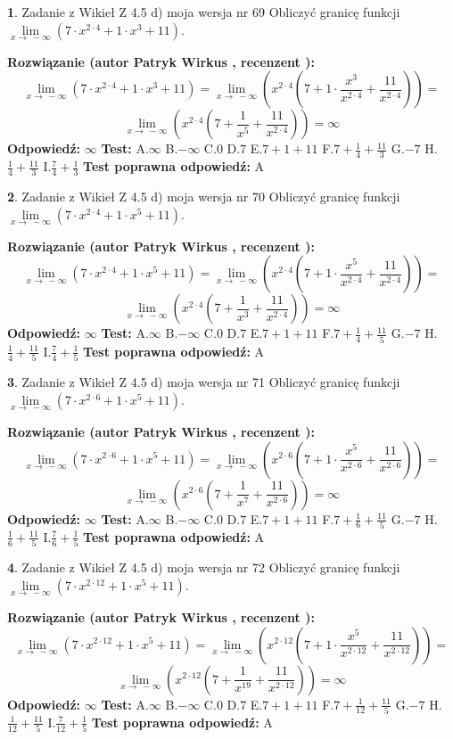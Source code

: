 \documentclass[12pt, a4paper]{article}
\theoremstyle{definition} %
\newtheorem{zad}{}
\newcommand{\zadStart}[1]{\begin{zad}#1\newline}
\newcommand{\zadStop}{\end{zad}}
\newcommand{\rozwStart}[2]{\noindent \textbf{Rozwiązanie (autor #1 , recenzent #2): }\newline}
\newcommand{\rozwStop}{\newline}
\newcommand{\odpStart}{\noindent \textbf{Odpowiedź:}\newline}
\newcommand{\odpStop}{\newline}
\newcommand{\testStart}{\noindent \textbf{Test:}\newline}
\newcommand{\testStop}{\newline}
\newcommand{\kluczStart}{\noindent \textbf{Test poprawna odpowiedź:}\newline}
\newcommand{\kluczStop}{\newline}
\begin{document}
\zadStart{Zadanie z Wikieł Z 4.5 d) moja wersja nr 69}
Obliczyć granicę funkcji  $\lim\limits_{x\to\ -\infty}(7 \cdot x^{2\cdot4}+1 \cdot x^{3}+11)$.
\zadStop
\rozwStart{Patryk Wirkus}{}
$$\lim\limits_{x\to\ -\infty}(7 \cdot x^{2\cdot4}+1 \cdot x^{3}+11) = \lim\limits_{x\to\ -\infty}(x^{2\cdot4}(7 +1 \cdot \frac{x^{3}}{x^{2\cdot4}}+\frac{11}{x^{2\cdot4}})) =$$ $$\lim\limits_{x\to\ -\infty}(x^{2\cdot4}(7 +\frac{1}{x^{5}}+\frac{11}{x^{2\cdot4}})) =\infty$$
\rozwStop
\odpStart
$\infty$
\odpStop
\testStart
A.$\infty$ B.$-\infty$ C.$0$ D.$7$ E.$7 + 1 + 11$
F.$7+\frac{1}{4}+\frac{11}{3}$ G.$-7$
H.$\frac{1}{4}+\frac{11}{3}$
I.$\frac{7}{4}+\frac{1}{3}$
\testStop
\kluczStart
A
\kluczStop



\zadStart{Zadanie z Wikieł Z 4.5 d) moja wersja nr 70}
Obliczyć granicę funkcji  $\lim\limits_{x\to\ -\infty}(7 \cdot x^{2\cdot4}+1 \cdot x^{5}+11)$.
\zadStop
\rozwStart{Patryk Wirkus}{}
$$\lim\limits_{x\to\ -\infty}(7 \cdot x^{2\cdot4}+1 \cdot x^{5}+11) = \lim\limits_{x\to\ -\infty}(x^{2\cdot4}(7 +1 \cdot \frac{x^{5}}{x^{2\cdot4}}+\frac{11}{x^{2\cdot4}})) =$$ $$\lim\limits_{x\to\ -\infty}(x^{2\cdot4}(7 +\frac{1}{x^{3}}+\frac{11}{x^{2\cdot4}})) =\infty$$
\rozwStop
\odpStart
$\infty$
\odpStop
\testStart
A.$\infty$ B.$-\infty$ C.$0$ D.$7$ E.$7 + 1 + 11$
F.$7+\frac{1}{4}+\frac{11}{5}$ G.$-7$
H.$\frac{1}{4}+\frac{11}{5}$
I.$\frac{7}{4}+\frac{1}{5}$
\testStop
\kluczStart
A
\kluczStop



\zadStart{Zadanie z Wikieł Z 4.5 d) moja wersja nr 71}
Obliczyć granicę funkcji  $\lim\limits_{x\to\ -\infty}(7 \cdot x^{2\cdot6}+1 \cdot x^{5}+11)$.
\zadStop
\rozwStart{Patryk Wirkus}{}
$$\lim\limits_{x\to\ -\infty}(7 \cdot x^{2\cdot6}+1 \cdot x^{5}+11) = \lim\limits_{x\to\ -\infty}(x^{2\cdot6}(7 +1 \cdot \frac{x^{5}}{x^{2\cdot6}}+\frac{11}{x^{2\cdot6}})) =$$ $$\lim\limits_{x\to\ -\infty}(x^{2\cdot6}(7 +\frac{1}{x^{7}}+\frac{11}{x^{2\cdot6}})) =\infty$$
\rozwStop
\odpStart
$\infty$
\odpStop
\testStart
A.$\infty$ B.$-\infty$ C.$0$ D.$7$ E.$7 + 1 + 11$
F.$7+\frac{1}{6}+\frac{11}{5}$ G.$-7$
H.$\frac{1}{6}+\frac{11}{5}$
I.$\frac{7}{6}+\frac{1}{5}$
\testStop
\kluczStart
A
\kluczStop



\zadStart{Zadanie z Wikieł Z 4.5 d) moja wersja nr 72}
Obliczyć granicę funkcji  $\lim\limits_{x\to\ -\infty}(7 \cdot x^{2\cdot12}+1 \cdot x^{5}+11)$.
\zadStop
\rozwStart{Patryk Wirkus}{}
$$\lim\limits_{x\to\ -\infty}(7 \cdot x^{2\cdot12}+1 \cdot x^{5}+11) = \lim\limits_{x\to\ -\infty}(x^{2\cdot12}(7 +1 \cdot \frac{x^{5}}{x^{2\cdot12}}+\frac{11}{x^{2\cdot12}})) =$$ $$\lim\limits_{x\to\ -\infty}(x^{2\cdot12}(7 +\frac{1}{x^{19}}+\frac{11}{x^{2\cdot12}})) =\infty$$
\rozwStop
\odpStart
$\infty$
\odpStop
\testStart
A.$\infty$ B.$-\infty$ C.$0$ D.$7$ E.$7 + 1 + 11$
F.$7+\frac{1}{12}+\frac{11}{5}$ G.$-7$
H.$\frac{1}{12}+\frac{11}{5}$
I.$\frac{7}{12}+\frac{1}{5}$
\testStop
\kluczStart
A
\kluczStop
\end{document}

